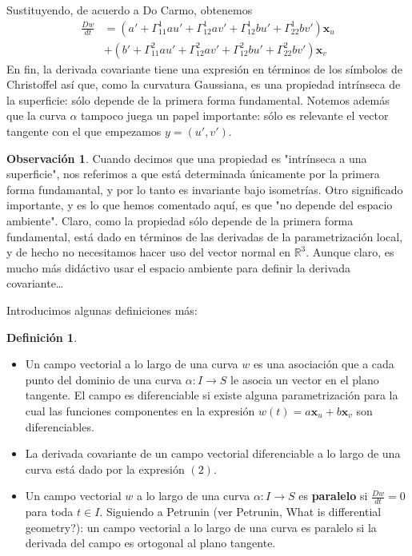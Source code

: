 \documentclass[spanish]{book}
\theoremstyle{definition}
\newtheorem*{defn}{Definición}
\newtheorem*{obs}{Observación}
\begin{document}
Sustituyendo, de acuerdo a Do Carmo, obtenemos
\begin{equation}
	\begin{aligned}
		\frac{Dw}{dt}&=(a'+\Gamma^1_{11}au'+\Gamma^1_{12}av'+\Gamma^1_{12}bu'+\Gamma^1_{22}bv')\mathbf x_u\\
		&+(b'+\Gamma^2_{11}au'+\Gamma^2_{12}av'+\Gamma^2_{12}bu'+\Gamma^2_{22}bv')\mathbf x_v
	\end{aligned}
\end{equation}
En fin, la derivada covariante tiene una expresión en términos de los símbolos de Christoffel así que, como la curvatura Gaussiana, es una propiedad intrínseca de la superficie: sólo depende de la primera forma fundamental. Notemos además que la curva $\alpha$ tampoco juega un papel importante: sólo es relevante el vector tangente con el que empezamos $y=(u',v')$.
\begin{obs}
	Cuando decimos que una propiedad es "intrínseca a una superficie", nos referimos a que está determinada únicamente por la primera forma fundamantal, y por lo tanto es invariante bajo isometrías. Otro significado importante, y es lo que hemos comentado aquí, es que "no depende del espacio ambiente". Claro, como la propiedad sólo depende de la primera forma fundamental, está dado en términos de las derivadas de la parametrización local, y de hecho no necesitamos hacer uso del vector normal en $\mathbb R^3$. Aunque claro, es mucho más didáctivo usar el espacio ambiente para definir la derivada covariante…
\end{obs}
Introducimos algunas definiciones más:
\begin{defn}\leavevmode
	\begin{itemize}
		\item Un campo vectorial a lo largo de una curva $w$ es una asociación que a cada punto del dominio de una curva $\alpha:I\to S$ le asocia un vector en el plano tangente. El campo es diferenciable si existe alguna parametrización para la cual las funciones componentes en la expresión $w(t)=a\mathbf x_u+b\mathbf x_v$ son diferenciables.
		\item La derivada covariante de un campo vectorial diferenciable a lo largo de una curva está dado por la expresión $(2)$.
		\item Un campo vectorial $w$ a lo largo de una curva $\alpha:I\to S$ es \textbf{paralelo} si $\frac{Dw}{dt}=0$ para toda $t\in I$. Siguiendo a Petrunin (ver Petrunin, What is differential geometry?): un campo vectorial a lo largo de una curva es paralelo si la derivada del campo es ortogonal al plano tangente.
	\end{itemize}
\end{defn}
\end{document}
